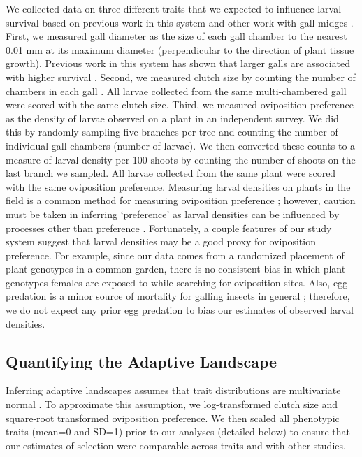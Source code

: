 \documentclass[11pt,]{article}
\begin{document}
We collected data on three different traits that we expected to
influence larval survival based on previous work in this system
\citep{Barbour2016} and other work with gall midges
\citep{Weis1983, Heath2018}. First, we measured gall diameter as the
size of each gall chamber to the nearest 0.01 mm at its maximum diameter
(perpendicular to the direction of plant tissue growth). Previous work
in this system has shown that larger galls are associated with higher
survival \citep{Barbour2016}. Second, we measured clutch size by
counting the number of chambers in each gall
\citep{Weis1983, Heath2018}. All larvae collected from the same
multi-chambered gall were scored with the same clutch size. Third, we
measured oviposition preference as the density of larvae observed on a
plant in an independent survey. We did this by randomly sampling five
branches per tree and counting the number of individual gall chambers
(number of larvae). We then converted these counts to a measure of
larval density per 100 shoots by counting the number of shoots on the
last branch we sampled. All larvae collected from the same plant were
scored with the same oviposition preference. Measuring larval densities
on plants in the field is a common method for measuring oviposition
preference \citep{Gripenberg2010}; however, caution must be taken in
inferring `preference' as larval densities can be influenced by
processes other than preference \citep{Singer1986}. Fortunately, a
couple features of our study system suggest that larval densities may be
a good proxy for oviposition preference. For example, since our data
comes from a randomized placement of plant genotypes in a common garden,
there is no consistent bias in which plant genotypes females are exposed
to while searching for oviposition sites. Also, egg predation is a minor
source of mortality for galling insects in general \citep{Hawkins1997};
therefore, we do not expect any prior egg predation to bias our
estimates of observed larval densities.

\subsection{Quantifying the Adaptive
Landscape}\label{quantifying-the-adaptive-landscape}

Inferring adaptive landscapes assumes that trait distributions are
multivariate normal \citep{Lande1983}. To approximate this assumption,
we log-transformed clutch size and square-root transformed oviposition
preference. We then scaled all phenotypic traits (mean=0 and SD=1) prior
to our analyses (detailed below) to ensure that our estimates of
selection were comparable across traits and with other studies.
\end{document}
